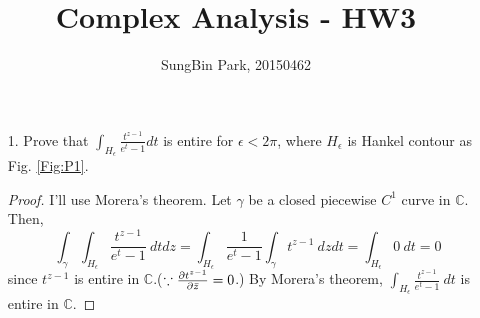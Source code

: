 \documentclass{article}
\begin{document}
\title{Complex Analysis - HW3}
\author{SungBin Park, 20150462} 

\maketitle
\begin{enumerate}
\item[1.] Prove that $\int_{H_\epsilon} \frac{t^{z-1}}{e^t-1}dt$ is entire for $\epsilon<2\pi$, where $H_\epsilon$ is Hankel contour as Fig. \ref{Fig:P1}.
\begin{proof}
I'll use Morera's theorem. Let $\gamma$ be a closed piecewise $C^1$ curve in $\mathbb{C}$. Then,
\begin{equation*}
\int_\gamma \int_{H_\epsilon} \frac{t^{z-1}}{e^t-1}~dtdz = \int_{H_\epsilon}\frac{1}{e^t-1} \int_\gamma t^{z-1}~dz dt=\int_{H_\epsilon}0~dt=0
\end{equation*}
since $t^{z-1}$ is entire in $\mathbb{C}$.($\because \pdv{t^{z-1}}{\bar{z}}=0$.) By Morera's theorem, $\int_{H_\epsilon} \frac{t^{z-1}}{e^t-1}~dt$ is entire in $\mathbb{C}$.


\end{proof}
\end{enumerate}
\end{document}
